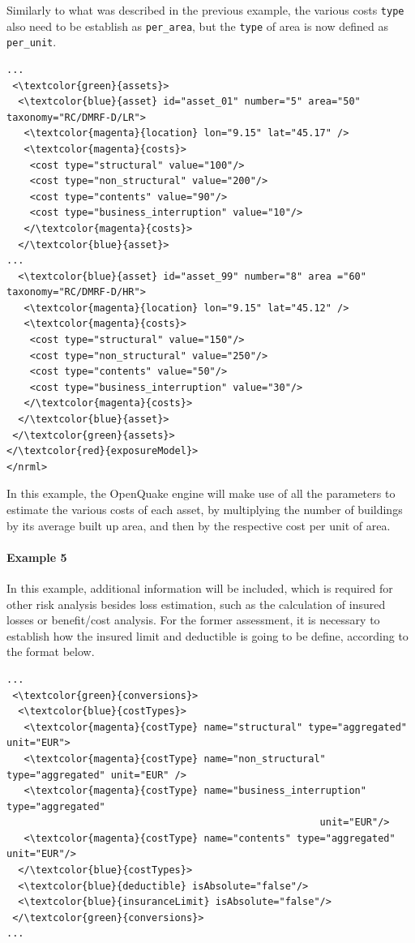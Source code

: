 Similarly to what was described in the previous example, the various costs \Verb+type+ also need to be establish as \Verb+per_area+, but the \Verb+type+ of area is now defined as \Verb+per_unit+.

\begin{Verbatim}[frame=single, commandchars=\\\{\}, samepage=false]
...
 <\textcolor{green}{assets}>
  <\textcolor{blue}{asset} id="asset_01" number="5" area="50" taxonomy="RC/DMRF-D/LR">
   <\textcolor{magenta}{location} lon="9.15" lat="45.17" />
   <\textcolor{magenta}{costs}>
    <cost type="structural" value="100"/>
    <cost type="non_structural" value="200"/>
    <cost type="contents" value="90"/>
    <cost type="business_interruption" value="10"/>
   </\textcolor{magenta}{costs}>
  </\textcolor{blue}{asset}>
...
  <\textcolor{blue}{asset} id="asset_99" number="8" area ="60" taxonomy="RC/DMRF-D/HR">
   <\textcolor{magenta}{location} lon="9.15" lat="45.12" />
   <\textcolor{magenta}{costs}>
    <cost type="structural" value="150"/>
    <cost type="non_structural" value="250"/>
    <cost type="contents" value="50"/>
    <cost type="business_interruption" value="30"/>
   </\textcolor{magenta}{costs}>
  </\textcolor{blue}{asset}>
 </\textcolor{green}{assets}>
</\textcolor{red}{exposureModel}>
</nrml>
\end{Verbatim}

In this example, the OpenQuake engine will make use of all the parameters to estimate the various costs of each asset, by multiplying the number of buildings by its average built up area, and then by the respective cost per unit of area. 

\paragraph{Example 5}
In this example, additional information will be included, which is required for other risk analysis besides loss estimation, such as the calculation of insured losses or benefit/cost analysis. For the former assessment, it is necessary to establish how the insured limit and deductible is going to be define, according to the format below. 
\begin{Verbatim}[frame=single, commandchars=\\\{\}, samepage=false]
...
 <\textcolor{green}{conversions}>
  <\textcolor{blue}{costTypes}>
   <\textcolor{magenta}{costType} name="structural" type="aggregated" unit="EUR">
   <\textcolor{magenta}{costType} name="non_structural" type="aggregated" unit="EUR" />
   <\textcolor{magenta}{costType} name="business_interruption" type="aggregated" 
                                                      unit="EUR"/>
   <\textcolor{magenta}{costType} name="contents" type="aggregated" unit="EUR"/>
  </\textcolor{blue}{costTypes}>
  <\textcolor{blue}{deductible} isAbsolute="false"/>
  <\textcolor{blue}{insuranceLimit} isAbsolute="false"/>
 </\textcolor{green}{conversions}>
...
\end{Verbatim}

